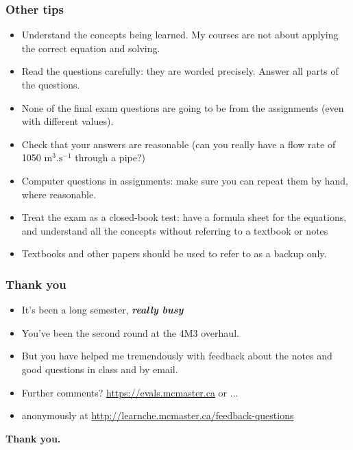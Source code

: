 \begin{frame}\frametitle{Other tips}
	\begin{itemize}
		\item	Understand the concepts being learned. My courses are not about applying the correct equation and solving.
		\item	Read the questions carefully: they are worded precisely. Answer all parts of the questions.
		\item	None of the final exam questions are going to be from the assignments (even with different values).
		\item	Check that your answers are reasonable (can you really have a flow rate of 1050 \(\text{m}^3.\text{s}^{-1}\) through a pipe?)
		\item	Computer questions in assignments: make sure you can repeat them by hand, where reasonable.
	\end{itemize}
	\begin{exampleblock}{{\color{myRed}{Most important advice}}}
		\begin{itemize}
			\item	Treat the exam as a closed-book test: have a formula sheet for the equations, and understand all the concepts without referring to a textbook or notes
			\item	Textbooks and other papers should be used to refer to as a backup only.
		\end{itemize}
	\end{exampleblock}
\end{frame}

\begin{frame}\frametitle{Thank you}
	\begin{itemize}
		\item	It's been a long semester, \textbf{\emph{really busy}}
		\item	You've been the second round at the 4M3 overhaul.
		\item	But you have helped me tremendously with feedback about the notes and good questions in class and by email.
		\item	Further comments? \href{https://evals.mcmaster.ca}{https://evals.mcmaster.ca} or ...
		\item	anonymously  at \href{http://learnche.mcmaster.ca/feedback-questions}{http://learnche.mcmaster.ca/feedback-questions}
	\end{itemize}
	\vspace{12pt}
	\textbf{Thank you.}
\end{frame}